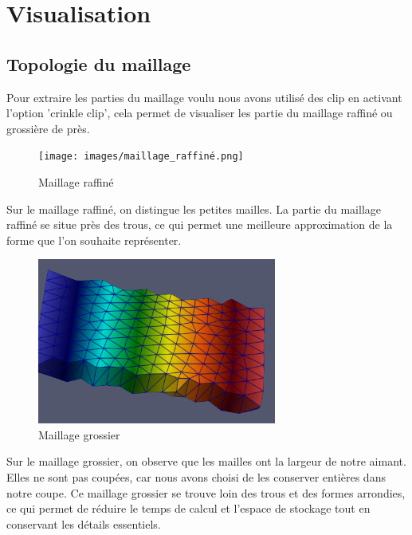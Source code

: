 \documentclass{article}
\begin{document}
\section{Visualisation}

\subsection{Topologie du maillage}

Pour extraire les parties du maillage voulu nous avons utilisé des clip en activant l'option 'crinkle clip', 
cela permet de visualiser les partie du maillage raffiné ou grossière de près.

\begin{figure}[H]
    \centering
    \texttt{[image: images/maillage\_raffiné.png]}
    \caption{Maillage raffiné}
\end{figure}

Sur le maillage raffiné, on distingue les petites mailles. 
La partie du maillage raffiné se situe près des trous, 
ce qui permet une meilleure approximation de la forme que l'on souhaite représenter.

\begin{figure}[H]
    \centering
    \includegraphics[width=0.7\textwidth]{images/maillage_grossier.png}
    \caption{Maillage grossier}
\end{figure}

Sur le maillage grossier, on observe que les mailles ont la largeur de notre aimant. 
Elles ne sont pas coupées, car nous avons choisi de les conserver entières dans notre coupe. 
Ce maillage grossier se trouve loin des trous et des formes arrondies, 
ce qui permet de réduire le temps de calcul et l’espace de stockage tout en conservant les détails essentiels.
\end{document}
